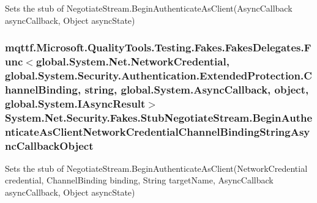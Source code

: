 Sets the stub of Negotiate\-Stream.\-Begin\-Authenticate\-As\-Client(\-Async\-Callback async\-Callback, Object async\-State)

\hypertarget{class_system_1_1_net_1_1_security_1_1_fakes_1_1_stub_negotiate_stream_aede3e5eb68f10b85dde9dfd6e095b5f3}{
\subsubsection[{Begin\-Authenticate\-As\-Client\-Network\-Credential\-Channel\-Binding\-String\-Async\-Callback\-Object}]{\setlength{\rightskip}{0pt plus 5cm}mqttf.\-Microsoft.\-Quality\-Tools.\-Testing.\-Fakes.\-Fakes\-Delegates.\-Func$<$global.\-System.\-Net.\-Network\-Credential, global.\-System.\-Security.\-Authentication.\-Extended\-Protection.\-Channel\-Binding, string, global.\-System.\-Async\-Callback, object, global.\-System.\-I\-Async\-Result$>$ System.\-Net.\-Security.\-Fakes.\-Stub\-Negotiate\-Stream.\-Begin\-Authenticate\-As\-Client\-Network\-Credential\-Channel\-Binding\-String\-Async\-Callback\-Object}}\label{class_system_1_1_net_1_1_security_1_1_fakes_1_1_stub_negotiate_stream_aede3e5eb68f10b85dde9dfd6e095b5f3}


Sets the stub of Negotiate\-Stream.\-Begin\-Authenticate\-As\-Client(\-Network\-Credential credential, Channel\-Binding binding, String target\-Name, Async\-Callback async\-Callback, Object async\-State)


